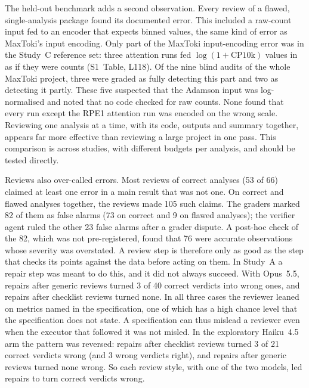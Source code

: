 The held-out benchmark adds a second observation. Every review of a
flawed, single-analysis package found its documented error. This
included a raw-count input fed to an encoder that expects binned values,
the same kind of error as MaxToki's input encoding. Only part of
the MaxToki input-encoding error was in the Study~C reference set: three attention runs
fed $\log(1+\text{CP10k})$ values in as if they were counts (S1~Table,
L118). Of the nine blind audits of the whole MaxToki project, three were
graded as fully detecting this part and two as detecting it partly. These
five suspected that the Adamson input was log-normalised and noted that
no code checked for raw counts. None found that every run except the RPE1
attention run was encoded on the wrong scale.
Reviewing one analysis at a time, with its code, outputs and summary
together, appears far more effective than reviewing a large project in
one pass. This comparison is across studies, with different budgets per
analysis, and should be tested directly.

Reviews also over-called errors. Most reviews of correct analyses (53 of
66) claimed at least one error in a main result that was not one. On
correct and flawed analyses together, the reviews made 105 such claims.
The graders marked 82 of them as false alarms (73 on correct and 9 on
flawed analyses); the verifier agent ruled the other 23 false alarms
after a grader dispute. A post-hoc check of the 82, which was not
pre-registered, found that 76 were accurate observations whose severity
was overstated. A review step
is therefore only as good as the step that checks its points against the
data before acting on them. In Study~A a repair step was meant to do
this, and it did not always succeed. With Opus~5.5, repairs after generic
reviews turned 3 of 40 correct verdicts into wrong ones, and repairs
after checklist reviews turned none. In all three cases the reviewer
leaned on metrics named in the specification, one of which has a high
chance level that the specification does not state. A specification can
thus mislead a reviewer even when the executor that followed it was not
misled. In the exploratory Haiku~4.5 arm the pattern was reversed:
repairs after checklist reviews turned 3 of 21 correct verdicts wrong
(and 3 wrong verdicts right), and repairs after generic reviews turned
none wrong. So each review style, with one of the two models, led
repairs to turn correct verdicts wrong.

